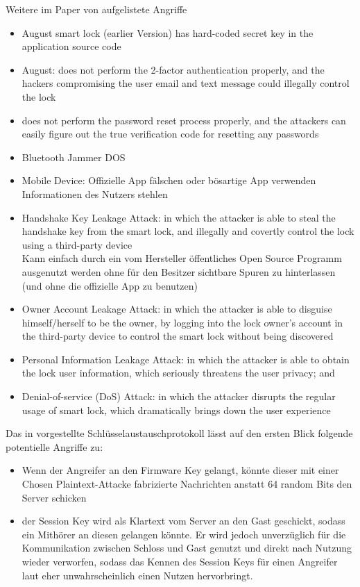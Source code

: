 	Weitere im Paper von \citeauthor{Ye2017} aufgelistete Angriffe
	\begin{itemize}
	    \item August smart lock (earlier Version) has hard-coded secret key in the application source code \cite{Rose2016}
		\item August: does not perform the 2-factor authentication properly, and the hackers compromising the user email and text message could illegally control the lock
		\item does not perform the password reset process properly, and the	attackers can easily figure out the true verification code for resetting any passwords
		\item Bluetooth Jammer \textrightarrow DOS
		\item Mobile Device: Offizielle App fälschen oder bösartige App verwenden \textrightarrow Informationen des Nutzers stehlen \textrightarrow 
		\item Handshake Key Leakage Attack: in which the attacker is able to steal the handshake key from the smart lock, and	illegally and covertly control the lock using a third-party	device\\
		    Kann einfach durch ein vom Hersteller öffentliches Open Source Programm ausgenutzt werden ohne für den Besitzer sichtbare Spuren zu hinterlassen (und ohne die offizielle App zu benutzen)
		\item Owner Account Leakage Attack: in which the attacker is able to disguise himself/herself to be the owner, by logging into the lock owner’s account in the third-party device to control the smart lock without being discovered
		\item Personal Information Leakage Attack: in which the attacker is able to obtain the lock user information, which seriously threatens the user privacy; and
		\item Denial-of-service (DoS) Attack: in which the attacker disrupts the regular usage of smart lock, which dramatically brings down the user experience
	\end{itemize}
	
	Das in  vorgestellte Schlüsselaustauschprotokoll lässt auf den ersten Blick folgende potentielle Angriffe zu\cite{Fuller2017}: 
	\begin{itemize}
	    \item Wenn der Angreifer an den Firmware Key gelangt, könnte dieser mit einer Chosen Plaintext-Attacke fabrizierte Nachrichten anstatt 64 random Bits den Server schicken  
	    \item der Session Key wird als Klartext vom Server an den Gast geschickt, sodass ein Mithörer an diesen gelangen könnte.
	        Er wird jedoch unverzüglich für die Kommunikation zwischen Schloss und Gast genutzt und direkt nach Nutzung wieder verworfen, sodass das Kennen des Session Keys für einen Angreifer laut \citeauthor{Fuller2017} eher unwahrscheinlich einen Nutzen hervorbringt.
	\end{itemize}
	
